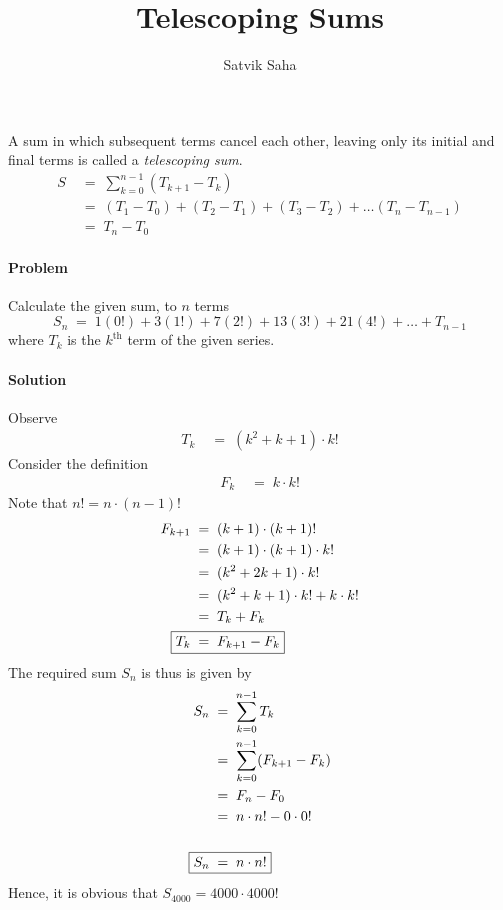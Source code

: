 \documentclass[a4paper, 11pt, reqno]{article}
\title{Telescoping Sums}
\author{Satvik Saha}
\date{}
\begin{document}
	\maketitle
	
	A sum in which subsequent terms cancel each other, leaving only its initial and final terms is called a
	\textit{telescoping sum}.
	\begin{align*}
		S  \; &= \; \sum_{k=0}^{n-1} (T_{k+1} - T_{k})	\\
		   \; &= \; (T_1 - T_0) + (T_2 - T_1) + (T_3 - T_2) + \dots (T_{n} - T_{n-1})	\\
		   \; &= \; T_{n} - T_{0}
	\end{align*}
	
	\paragraph{Problem}
	Calculate the given sum, to $n$ terms
	\begin{equation*}
		S_n  \;=\;  1(0!) + 3(1!) + 7(2!) + 13(3!) + 21(4!) + \dots + T_{n-1}
	\end{equation*}
	where $T_{k}$ is the $k^{\text{th}}$ term of the given series.
	\paragraph{Solution}
	Observe
	\begin{align*}
		T_k  \; &= \;  (k^2 + k + 1)\cdot k!
	\end{align*}
	Consider the definition
	\begin{align*}
		F_{k}  \; &= \;  k\cdot k!
	\end{align*}
	Note that $n! = n\cdot (n-1)!$
	\begin{align*}
		F_{k+1}  \; &= \; (k + 1)\cdot (k + 1)! \\
			 \; &= \; (k + 1)\cdot (k + 1)\cdot k! \\
			 \; &= \; (k^2 + 2k + 1)\cdot k! \\
			 \; &= \; (k^2 + k + 1)\cdot k! + k\cdot k! \\
			 \; &= \; T_k + F_k \\
		\Aboxed{T_k \; &= \;  F_{k+1} - F_{k}}
	\end{align*}
	The required sum $S_n$ is thus is given by
	\begin{align*}
		S_n  	\; &= \; \sum_{k=0}^{n-1} T_k \\
		 	\; &= \; \sum_{k=0}^{n-1} (F_{k+1} - F_{k}) \\
			\; &= \; F_n - F_0 \\
			\; &= \; n\cdot n! - 0\cdot 0! \\\\
		\Aboxed{S_n	\; &= \;  n\cdot n!}
	\end{align*}
	Hence, it is obvious that $S_{4000} = 4000\cdot 4000!$
\end{document}
